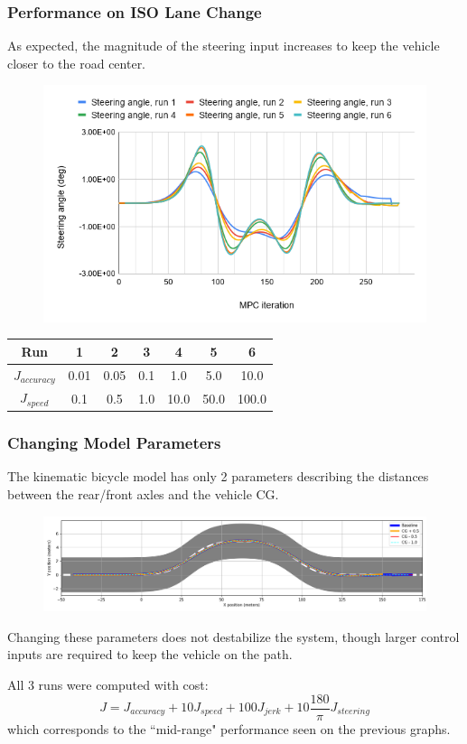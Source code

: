 \documentclass{beamer}
\begin{document}
\begin{frame}
\frametitle{Performance on ISO Lane Change}

As expected, the magnitude of the steering input increases to keep the vehicle closer to the road center.
\vspace{-0.5em}
\begin{figure}
	\includegraphics[width=0.8\linewidth]{figures/steering_angle.png}
\end{figure}
\vspace{-0.5em}
\small
\begin{table}
	\begin{tabular}{c|cccccc}
		Run & 1 & 2 & 3 & 4 & 5 & 6
		\\\hline
		$J_{accuracy}$ & 0.01 & 0.05 & 0.1 & 1.0 & 5.0 & 10.0
		\\
		$J_{speed}$ & 0.1 & 0.5 & 1.0 & 10.0 & 50.0 & 100.0
	\end{tabular}
\end{table}
\normalsize
\end{frame}

\begin{frame}
\frametitle{Changing Model Parameters}

The kinematic bicycle model has only 2 parameters describing the distances between the rear/front axles and the vehicle CG.

\vspace{-0.5em}
\begin{figure}
	\centering
	\includegraphics[width=1.0\linewidth]{figures/road_paths_cg.png}
\end{figure}


Changing these parameters does not destabilize the system, though larger control inputs are required to keep the vehicle on the path.

All 3 runs were computed with cost:
$$J = J_{accuracy} + 10 J_{speed} + 100J_{jerk} + 10\frac{180}{\pi} J_{steering}$$
which corresponds to the ``mid-range" performance seen on the previous graphs.
\end{frame}
\end{document}
